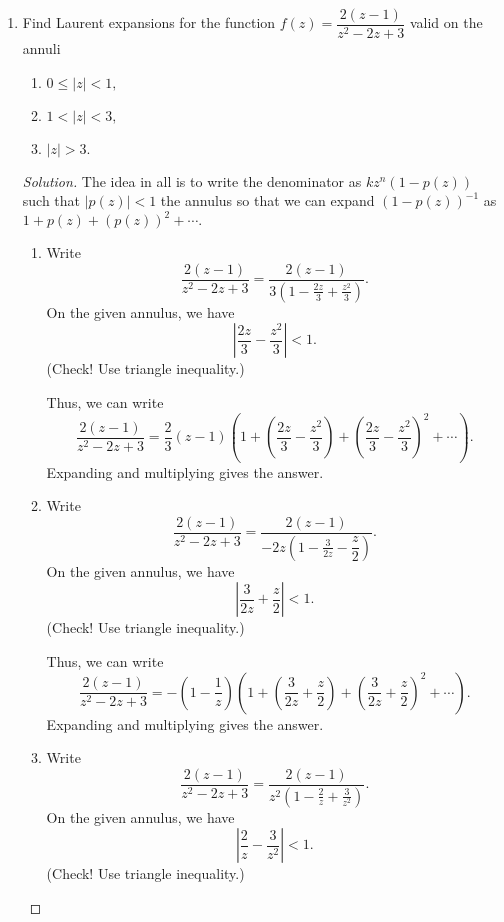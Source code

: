 \documentclass[12pt]{article}
\theoremstyle{definition}
\newenvironment{soln}{\begin{proof}[Solution]}{\end{proof}}
\begin{document}
\begin{enumerate}[leftmargin=*]
	\item Find Laurent expansions for the function $f(z) = \dfrac{2(z - 1)}{z^2 - 2z + 3}$ valid on the annuli
	\begin{enumerate}
		\item $0 \le \left|z\right| < 1,$
		\item $1 < |z| < 3,$
		\item $|z| > 3.$
	\end{enumerate}
	\begin{soln}
	The idea in all is to write the denominator as $kz^n(1 - p(z))$ such that $|p(z)| < 1$ the annulus so that we can expand $(1 - p(z))^{-1}$ as $1 + p(z) + (p(z))^2 + \cdots.$
	\begin{enumerate}
		\item Write
		\begin{equation*} 
			\dfrac{2(z - 1)}{z^2 - 2z + 3} = \dfrac{2(z - 1)}{3\left(1 - \frac{2z}{3} + \frac{z^2}{3}\right)}.
		\end{equation*}
		On the given annulus, we have
		\begin{equation*} 
			\left|\frac{2z}{3} - \frac{z^2}{3}\right| < 1.
		\end{equation*}
		(Check! Use triangle inequality.)

		Thus, we can write
		\begin{equation*} 
			\dfrac{2(z - 1)}{z^2 - 2z + 3} = \dfrac{2}{3}(z - 1)\left(1 + \left(\dfrac{2z}{3} - \dfrac{z^2}{3}\right) + \left(\dfrac{2z}{3} - \dfrac{z^2}{3}\right)^2 + \cdots\right).
		\end{equation*}
		Expanding and multiplying gives the answer.
		\item Write
		\begin{equation*} 
			\dfrac{2(z - 1)}{z^2 - 2z + 3} = \dfrac{2(z - 1)}{-2z\left(1 - \frac{3}{2z} - \dfrac{z}{2}\right)}.
		\end{equation*}
		On the given annulus, we have
		\begin{equation*} 
			\left|\frac{3}{2z} + \dfrac{z}{2}\right| < 1.
		\end{equation*}
		(Check! Use triangle inequality.)

		Thus, we can write
		\begin{equation*} 
			\dfrac{2(z - 1)}{z^2 - 2z + 3} = -\left(1 - \dfrac{1}{z}\right)\left(1 + \left(\frac{3}{2z} + \dfrac{z}{2}\right) + \left(\frac{3}{2z} + \dfrac{z}{2}\right)^2 + \cdots\right).
		\end{equation*}
		Expanding and multiplying gives the answer.
		\item Write
		\begin{equation*} 
			\dfrac{2(z - 1)}{z^2 - 2z + 3} = \dfrac{2(z - 1)}{z^2\left(1 - \frac{2}{z} + \frac{3}{z^2}\right)}.
		\end{equation*}
		On the given annulus, we have
		\begin{equation*} 
			\left|\frac{2}{z} - \frac{3}{z^2}\right| < 1.
		\end{equation*}
		(Check! Use triangle inequality.)


\end{enumerate}
\end{soln}
\end{enumerate}
\end{document}
